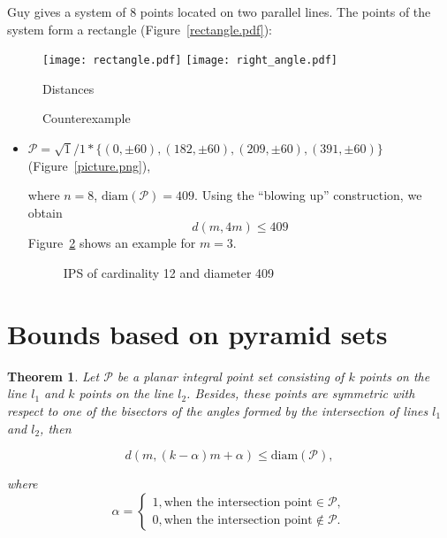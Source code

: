 \documentclass[12pt]{article}
\theoremstyle{theorem}
\newtheorem{theorem}{Theorem}
\theoremstyle{dfn}
\theoremstyle{remark}
\begin{document}
Guy gives \cite[D 20]{guy2013unsolved} a system of $8$ points located
on two parallel lines. The points of the system form a rectangle
(Figure~\ref{rectangle.pdf}):

\begin{figure}[htbp]
	\texttt{[image: rectangle.pdf]}
	\hfill
	\texttt{[image: right\_angle.pdf]}
	\\
	\parbox{.65\linewidth}{\caption{Distances}
	\label{rectangle.pdf}}
	\hfill
	\parbox{.5\linewidth}{\caption{Counterexample}
	\label{right_angle.pdf}}
\end{figure}

\begin{itemize}
\setlength{\itemsep}{-1mm}


\item
$\mathcal{P}=\sqrt{1}/{1} * \{ (0, \pm 60),
(182 , \pm 60),
(209 , \pm 60),
(391 , \pm 60)\}
$
(Figure~\ref{picture.png}),

where $n = 8$, $\operatorname{diam(\mathcal{P})} = 409$. Using the ``blowing up''
construction, we obtain
\begin{equation}\label{result1}
d(m, 4m) \leq 409
\end{equation}
Figure~\ref{picture_11.pdf} shows an example for $m = 3$.


\begin{figure}[h!]
\parbox{1\linewidth}{\caption{IPS of cardinality 12 and diameter 409}
\label{picture_11.pdf}}
\end{figure}


\end{itemize}

\section{Bounds based on pyramid sets}

\begin{theorem}
Let $\mathcal{P}$ be a planar integral point set consisting of $k$
points on the line $l_{1}$ and $k$ points on the line $l_{2}$. Besides, these
points are symmetric with respect to one of the bisectors of the angles
formed by the intersection of lines $l_{1}$ and $l_{2}$, then

\begin{equation}\label{formula2}
d(m, (k - \alpha)m + \alpha) \leq \operatorname{diam(\mathcal{P})},
\end{equation}

where
\begin{equation*}
\alpha =
\begin{cases}
1, \text{when the intersection point} \in \mathcal{P}, \\
0, \text{when the intersection point} \notin \mathcal{P}.
\end{cases}
\end{equation*}

\end{theorem}
\end{document}
